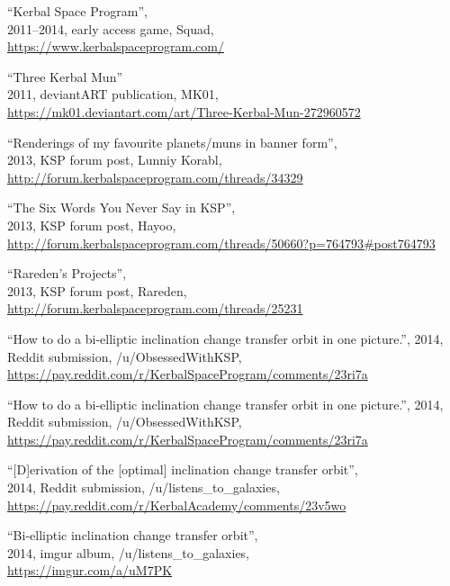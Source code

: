 \renewcommand{\cleardoublepage}{\ifodd\thepage\null\newpage\fi}
\fancyhf{}
\renewcommand{\footrulewidth}{0pt}
\begin{thebibliography}{99}
\ClearWallPaper

“Kerbal Space Program”, \\
2011--2014, early access game, Squad, \\
\url{https://www.kerbalspaceprogram.com/}

“Three Kerbal Mun” \\
2011, deviantART publication, MK01, \\
\url{https://mk01.deviantart.com/art/Three-Kerbal-Mun-272960572}

“Renderings of my favourite planets/muns in banner form”, \\
2013, KSP forum post, Lunniy Korabl, \\
\url{http://forum.kerbalspaceprogram.com/threads/34329}

“The Six Words You Never Say in KSP”, \\
2013, KSP forum post, Hayoo, \\
{\footnotesize \url{http://forum.kerbalspaceprogram.com/threads/50660?p=764793#post764793}}

“Rareden's Projects”, \\
2013, KSP forum post, Rareden, \\
\url{http://forum.kerbalspaceprogram.com/threads/25231}

“How to do a bi-elliptic inclination change transfer orbit in one picture.”,
2014, Reddit submission, /u/ObsessedWithKSP, \\
\url{https://pay.reddit.com/r/KerbalSpaceProgram/comments/23ri7a}

“How to do a bi-elliptic inclination change transfer orbit in one picture.”,
2014, Reddit submission, /u/ObsessedWithKSP, \\
\url{https://pay.reddit.com/r/KerbalSpaceProgram/comments/23ri7a}

“[D]erivation of the [optimal] inclination change transfer orbit”, \\
2014, Reddit submission, /u/listens\_to\_galaxies, \\
\url{https://pay.reddit.com/r/KerbalAcademy/comments/23v5wo}

“Bi-elliptic inclination change transfer orbit”, \\
2014, imgur album, /u/listens\_to\_galaxies, \\
\url{https://imgur.com/a/uM7PK}


\end{thebibliography}
